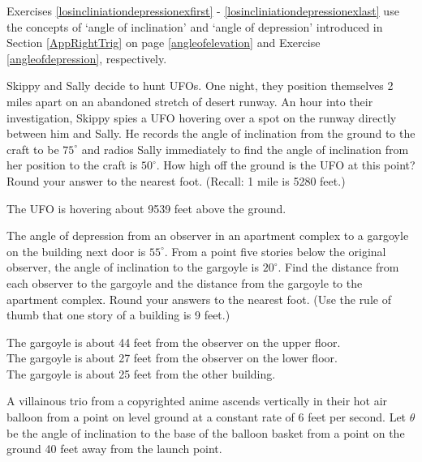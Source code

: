 \documentclass{ximera}
\begin{document}
\begin{question}
Exercises \ref{losincliniationdepressionexfirst} -  \ref{losincliniationdepressionexlast} use the concepts of `angle of inclination' and `angle of depression' introduced in Section \ref{AppRightTrig} on page \ref{angleofelevation} and Exercise \ref{angleofdepression}, respectively.


\begin{problem} \label{losincliniationdepressionexfirst} Skippy and Sally decide to hunt UFOs.  One night, they position themselves 2 miles apart on an abandoned stretch of desert runway.  An hour into their investigation, Skippy spies a UFO hovering over a spot on the runway directly between him and Sally.  He records the angle of inclination from the ground to the craft to be $75^{\circ}$ and radios Sally immediately to find the angle of inclination from her position to the craft is $50^{\circ}$.  How high off the ground is the UFO at this point?  Round your answer to the nearest foot.  (Recall:  1 mile is 5280 feet.)

\begin{solution}
The UFO is hovering about 9539 feet above the ground.
\end{solution}
\end{problem}

\begin{problem} 
The angle of depression from an observer in an apartment complex to a gargoyle on the building next door is $55^{\circ}$.  From a point five stories below the original observer, the angle of inclination to the gargoyle is $20^{\circ}$.  Find the distance from each observer to the gargoyle and the distance from the gargoyle to the apartment complex.  Round your answers to the nearest foot.  (Use the rule of thumb that one story of a building is 9 feet.) 

\begin{solution}
The gargoyle is about 44 feet from the observer on the upper floor. \\
The gargoyle is about 27 feet from the observer on the lower floor. \\
The gargoyle is about 25 feet from the other building.
\end{solution}
\end{problem}

\begin{problem} \label{losincliniationdepressionexlast} A villainous trio from a copyrighted anime ascends vertically in their hot air balloon from a point on level ground at a constant rate of $6$ feet per second.  Let $\theta$ be the angle of inclination to the base of the balloon basket from a point on the ground 40 feet away from the launch point.  


\end{problem}
\end{question}
\end{document}

